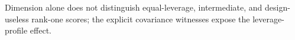 Dimension alone does not distinguish equal-leverage, intermediate, and design-useless rank-one scores; the explicit covariance witnesses expose the leverage-profile effect.